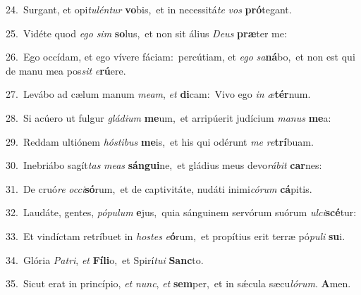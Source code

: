{\numbfont\textcolor{\numbcolor}{24.}}~Surgant, et opi\-\textit{tu}\-\textit{lén}\textit{tur} \textbf{vo}\-bis,~\star et in necessitá\textit{te} \textit{vos} \textbf{pró}\-tegant.\par
{\numbfont\textcolor{\numbcolor}{25.}}~Vidéte quod \textit{e}\-\textit{go} \textit{sim} \textbf{so}\-lus,~\star et non sit álius \textit{De}\-\textit{us} \textbf{præ}\-ter me:\par
{\numbfont\textcolor{\numbcolor}{26.}}~Ego occídam, et ego vívere fáciam:~\dagger percútiam, et \textit{e}\-\textit{go} \textit{sa}\-\textbf{ná}bo,~\star et non est qui de manu mea pos\textit{sit} \textit{e}\-\textbf{rú}ere.\par
{\numbfont\textcolor{\numbcolor}{27.}}~Levábo ad cælum manum \textit{me}\-\textit{am}, \textit{et} \textbf{di}\-cam:~\star Vivo ego \textit{in} \textit{æ}\-\textbf{tér}num.\par
{\numbfont\textcolor{\numbcolor}{28.}}~Si acúero ut fulgur \textit{glá}\-\textit{di}\textit{um} \textbf{me}\-um,~\star et arripúerit judícium \textit{ma}\-\textit{nus} \textbf{me}\-a:\par
{\numbfont\textcolor{\numbcolor}{29.}}~Reddam ultiónem \textit{hós}\-\textit{ti}\textit{bus} \textbf{me}\-is,~\star et his qui odérunt \textit{me} \textit{re}\-\textbf{trí}buam.\par
{\numbfont\textcolor{\numbcolor}{30.}}~Inebriábo sagít\textit{tas} \textit{me}\-\textit{as} \textbf{sán}\-\textbf{gui}ne,~\star et gládius meus devo\-\textit{rá}\-\textit{bit} \textbf{car}\-nes:\par
{\numbfont\textcolor{\numbcolor}{31.}}~De cruó\textit{re} \textit{oc}\-\textit{ci}\textbf{só}rum,~\star et de captivitáte, nudáti inimi\-\textit{có}\-\textit{rum} \textbf{cá}\-pitis.\par
{\numbfont\textcolor{\numbcolor}{32.}}~Laudáte, gentes, \textit{pó}\-\textit{pu}\textit{lum} \textbf{e}\-jus,~\star quia sánguinem servórum suórum \textit{ul}\-\textit{ci}\textbf{scé}tur:\par
{\numbfont\textcolor{\numbcolor}{33.}}~Et vindíctam retríbuet in \textit{hos}\-\textit{tes} \textit{e}\-\textbf{ó}rum,~\star et propítius erit terræ pó\-\textit{pu}\-\textit{li} \textbf{su}\-i.\par
{\numbfont\textcolor{\numbcolor}{34.}}~Glória \textit{Pa}\-\textit{tri}, \textit{et} \textbf{Fí}\-\textbf{li}o,~\star et Spirí\-\textit{tu}\-\textit{i} \textbf{Sanc}\-to.\par
{\numbfont\textcolor{\numbcolor}{35.}}~Sicut erat in princípio, \textit{et} \textit{nunc}\-, \textit{et} \textbf{sem}\-per,~\star et in sǽcula sæcu\-\textit{ló}\-\textit{rum}. \textbf{A}\-men.\par
